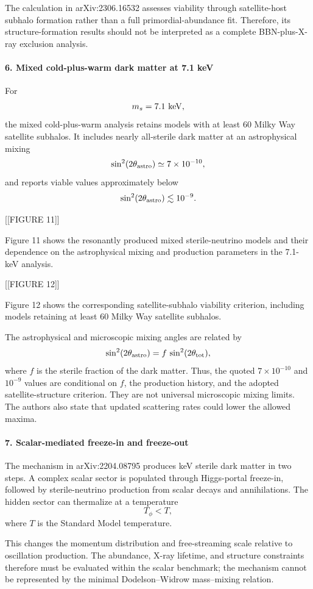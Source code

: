 \documentclass[11pt,a4paper]{article}
\begin{document}
The calculation in arXiv:2306.16532 assesses viability through satellite-host subhalo formation rather than a full primordial-abundance fit. Therefore, its structure-formation results should not be interpreted as a complete BBN-plus-X-ray exclusion analysis.

\paragraph{6. Mixed cold-plus-warm dark matter at 7.1 keV}
For \[ m_s=7.1\ {\rm keV}, \] the mixed cold-plus-warm analysis retains models with at least 60 Milky Way satellite subhalos. It includes nearly all-sterile dark matter at an astrophysical mixing \[ \sin^2(2\theta_{\rm astro})\simeq 7\times10^{-10}, \] and reports viable values approximately below \[ \sin^2(2\theta_{\rm astro})\lesssim 10^{-9}. \]

[[FIGURE 11]]

Figure 11 shows the resonantly produced mixed sterile-neutrino models and their dependence on the astrophysical mixing and production parameters in the 7.1-keV analysis.

[[FIGURE 12]]

Figure 12 shows the corresponding satellite-subhalo viability criterion, including models retaining at least 60 Milky Way satellite subhalos.

The astrophysical and microscopic mixing angles are related by \[ \sin^2(2\theta_{\rm astro}) = f\,\sin^2(2\theta_{\rm tot}), \] where \(f\) is the sterile fraction of the dark matter. Thus, the quoted \(7\times10^{-10}\) and \(10^{-9}\) values are conditional on \(f\), the production history, and the adopted satellite-structure criterion. They are not universal microscopic mixing limits. The authors also state that updated scattering rates could lower the allowed maxima.

\paragraph{7. Scalar-mediated freeze-in and freeze-out}
The mechanism in arXiv:2204.08795 produces keV sterile dark matter in two steps. A complex scalar sector is populated through Higgs-portal freeze-in, followed by sterile-neutrino production from scalar decays and annihilations. The hidden sector can thermalize at a temperature \[ T_\phi<T, \] where \(T\) is the Standard Model temperature.

This changes the momentum distribution and free-streaming scale relative to oscillation production. The abundance, X-ray lifetime, and structure constraints therefore must be evaluated within the scalar benchmark; the mechanism cannot be represented by the minimal Dodelson--Widrow mass--mixing relation.
\end{document}
